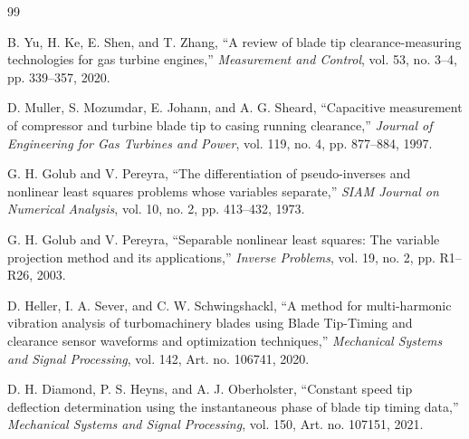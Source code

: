 \documentclass[UTF8,12pt,a4paper]{ctexart}
\begin{document}
\clearpage
\small
\begin{thebibliography}{99}

B. Yu, H. Ke, E. Shen, and T. Zhang,
``A review of blade tip clearance-measuring technologies for gas turbine engines,''
\emph{Measurement and Control}, vol. 53, no. 3--4, pp. 339--357, 2020.

D. Muller, S. Mozumdar, E. Johann, and A. G. Sheard,
``Capacitive measurement of compressor and turbine blade tip to casing running clearance,''
\emph{Journal of Engineering for Gas Turbines and Power}, vol. 119, no. 4, pp. 877--884, 1997.

G. H. Golub and V. Pereyra,
``The differentiation of pseudo-inverses and nonlinear least squares problems whose variables separate,''
\emph{SIAM Journal on Numerical Analysis}, vol. 10, no. 2, pp. 413--432, 1973.

G. H. Golub and V. Pereyra,
``Separable nonlinear least squares: The variable projection method and its applications,''
\emph{Inverse Problems}, vol. 19, no. 2, pp. R1--R26, 2003.

D. Heller, I. A. Sever, and C. W. Schwingshackl,
``A method for multi-harmonic vibration analysis of turbomachinery blades using Blade Tip-Timing and clearance sensor waveforms and optimization techniques,''
\emph{Mechanical Systems and Signal Processing}, vol. 142, Art. no. 106741, 2020.

D. H. Diamond, P. S. Heyns, and A. J. Oberholster,
``Constant speed tip deflection determination using the instantaneous phase of blade tip timing data,''
\emph{Mechanical Systems and Signal Processing}, vol. 150, Art. no. 107151, 2021.

\end{thebibliography}
\end{document}

